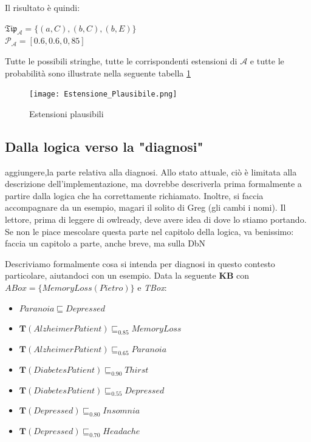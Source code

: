 Il risultato è quindi:
\begin{multicols}{2}
	$ \mathfrak{Tip}_{\mathcal{A}} = \{(a,C),(b,C),(b,E)\} $ \\
	$ \mathcal{P_{A}} = [0.6, 0.6, 0,85] $
\end{multicols}
Tutte le possibili stringhe, tutte le corrispondenti estensioni di $ \mathcal{A} $ e tutte le probabilità 
sono illustrate nella seguente tabella \ref{fig:estesioni}
\clearpage
\begin{figure}[t]
	\texttt{[image: Estensione\_Plausibile.png]}
	\caption{Estensioni plausibili}
	\label{fig:estesioni}
	\centering
\end{figure}

\subsection{Dalla logica verso la "diagnosi"}

aggiungere,la parte relativa alla diagnosi. Allo stato attuale, ciò è limitata alla descrizione dell'implementazione, ma dovrebbe descriverla prima formalmente a partire dalla logica che ha correttamente richiamato. Inoltre, si faccia accompagnare da un esempio, magari il solito di Greg (gli cambi i nomi). Il lettore, prima di leggere di owlready, deve avere idea di dove lo stiamo portando. Se non le piace mescolare questa parte nel capitolo della logica, va benissimo: faccia un capitolo a parte, anche breve, ma sulla DbN

Descriviamo formalmente cosa si intenda per diagnosi in questo contesto particolare, aiutandoci con un esempio.
Data la seguente \textbf{KB} con \\ $ \textit{ABox} = \{MemoryLoss(Pietro)\} $ e \textit{TBox}:
\begin{itemize}
	\item $ Paranoia \sqsubseteq Depressed $
	\item $ \mathbf{T}(AlzheimerPatient) \sqsubseteq_{0.85} MemoryLoss $
	\item $ \mathbf{T}(AlzheimerPatient) \sqsubseteq_{0.65} Paranoia $
	\item $ \mathbf{T}(DiabetesPatient) \sqsubseteq_{0.90} Thirst $
	\item $ \mathbf{T}(DiabetesPatient) \sqsubseteq_{0.55} Depressed $
	\item $ \mathbf{T}(Depressed) \sqsubseteq_{0.80} Insomnia $
	\item $ \mathbf{T}(Depressed) \sqsubseteq_{0.70} Headache $
\end{itemize}

